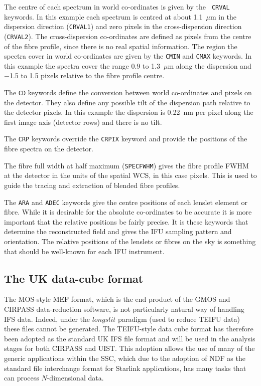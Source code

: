 \documentclass[twoside,11pt]{article}
\newcommand{\htmlref}[2]{#1}
\newcommand{\xref}[3]{#1}
\newcommand{\xlabel}[1]{}
\begin{document}
\begin{\htmlonly}
The centre of each spectrum in world co-ordinates is given by the {\tt
CRVAL} keywords.  In this example each spectrum is centred at about
1.1~$\mu$m in the dispersion direction ({\tt CRVAL1}) and zero pixels
in the cross-dispersion direction ({\tt CRVAL2}).  The cross-dispersion
co-ordinates are defined as pixels from the centre of the fibre
profile, since there is no real spatial information.  The region the
spectra cover in world co-ordinates are given by the {\tt CMIN} and
{\tt CMAX} keywords.  In this example the spectra cover the range 0.9
to 1.3~$\mu$m along the dispersion and $-$1.5 to 1.5 pixels relative to
the fibre profile centre.

The {\tt CD} keywords define the conversion between world co-ordinates
and pixels on the detector.  They also define any possible tilt of the
dispersion path relative to the detector pixels.  In this example the
dispersion is 0.22~nm per pixel along the first image axis (detector
rows) and there is no tilt.

The {\tt CRP} keywords override the {\tt CRPIX} keyword and provide
the positions of the fibre spectra on the detector.

The fibre full width at half maximum ({\tt SPECFWHM}) gives the fibre
profile FWHM at the detector in the units of the spatial WCS, in this
case pixels.  This is used to guide the tracing and extraction of
blended fibre profiles.

The {\tt ARA} and {\tt ADEC} keywords give the centre positions of
each lenslet element or fibre.  While it is desirable for the absolute
co-ordinates to be accurate it is more important that the relative
positions be fairly precise.  It is these keywords that determine the
reconstructed field and gives the IFU sampling pattern and
orientation.  The relative positions of the lenslets or fibres on the
sky is something that should be well-known for each IFU instrument.

\subsection{\xlabel{sc16_teifufile}The UK data-cube format\label{sc16_teifufile}}

The MOS-style \htmlref{MEF format}{sc16_gmosfile}, which is the end
product of the GMOS and CIRPASS data-reduction software, is not
particularly natural way of handling IFS data.  Indeed, under the
$longslit$ paradigm (used to reduce TEIFU data) these files cannot be
generated.  The TEIFU-style data cube format has therefore been
adopted as the standard UK IFS file format and will be used in the
analysis stages for both CIRPASS and UIST.  This adoption allows the
use of many of the generic applications within the SSC, which due to
the adoption of \xref{NDF}{sun33}{} as the standard file interchange
format for Starlink applications, has many tasks that can process
$N$-dimensional data.


\end{\htmlonly}
\end{document}
